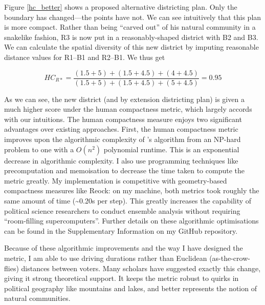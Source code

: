 \documentclass[]{article}
\begin{document}
Figure \ref{hc_better} shows a proposed alternative districting plan.
Only the boundary has changed---the points have not. We can see
intuitively that this plan is more compact. Rather than being ``carved
out'' of his natural community in a snakelike fashion, R3 is now put in
a reasonably-shaped district with B2 and B3. We can calculate the
spatial diversity of this new district by imputing reasonable distance
values for R1--B1 and R2--B1. We thus get

\[HC_{R*} = \frac{(1.5 + 5) + (1.5+4.5) + (4 + 4.5)}{(1.5+5) + (1.5+4.5) + (5+4.5)} = 0.95\]

As we can see, the new district (and by extension districting plan) is
given a much higher score under the human compactness metric, which
largely accords with our intuitions. The human compactness measure
enjoys two significant advantages over existing approaches. First, the
human compactness metric improves upon the algorithmic complexity of
\citeauthor{fh2011}'s algorithm from an NP-hard problem to one with a
\(O(n^2)\) polynomial runtime. This is an exponential decrease in
algorithmic complexity. I also use programming techniques like
precomputation and memoisation to decrease the time taken to compute the
metric greatly. My implementation is competitive with geometry-based
compactness measures like Reock: on my machine, both metrics took
roughly the same amount of time (\textasciitilde{}0.20s per step). This
greatly increases the capability of political science researchers to
conduct ensemble analysis without requiring ``room-filling
supercomputers''. Further details on these algorithmic optimisations can
be found in the Supplementary Information on my GitHub repository.

Because of these algorithmic improvements and the way I have designed
the metric, I am able to use driving durations rather than Euclidean
(as-the-crow-flies) distances between voters. Many scholars have
suggested exactly this change, giving it strong theoretical support. It
keeps the metric robust to quirks in political geography like mountains
and lakes, and better represents the notion of natural communities.
\end{document}
